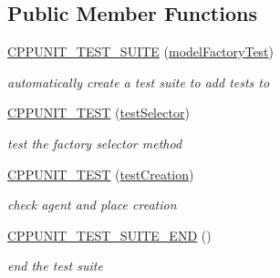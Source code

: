 \subsection*{Public Member Functions}
\begin{DoxyCompactItemize}
\item 
\mbox{\label{classmodelFactoryTest_a20b209282561b641257928824314a49c}} 
\mbox{\hyperlink{classmodelFactoryTest_a20b209282561b641257928824314a49c}{C\+P\+P\+U\+N\+I\+T\+\_\+\+T\+E\+S\+T\+\_\+\+S\+U\+I\+TE}} (\mbox{\hyperlink{classmodelFactoryTest}{model\+Factory\+Test}})
\begin{DoxyCompactList}\small\item\em automatically create a test suite to add tests to \end{DoxyCompactList}\item 
\mbox{\label{classmodelFactoryTest_a52899c75fe7f21fd6a1c96151302bb5a}} 
\mbox{\hyperlink{classmodelFactoryTest_a52899c75fe7f21fd6a1c96151302bb5a}{C\+P\+P\+U\+N\+I\+T\+\_\+\+T\+E\+ST}} (\mbox{\hyperlink{classmodelFactoryTest_ae0327f9c7d653c9a4864122a3f088118}{test\+Selector}})
\begin{DoxyCompactList}\small\item\em test the factory selector method \end{DoxyCompactList}\item 
\mbox{\label{classmodelFactoryTest_a46a5eadbc8f9d03e0c6d5334ee687d49}} 
\mbox{\hyperlink{classmodelFactoryTest_a46a5eadbc8f9d03e0c6d5334ee687d49}{C\+P\+P\+U\+N\+I\+T\+\_\+\+T\+E\+ST}} (\mbox{\hyperlink{classmodelFactoryTest_a1bea8789a99ca88af5942eaf6c3fa687}{test\+Creation}})
\begin{DoxyCompactList}\small\item\em check agent and place creation \end{DoxyCompactList}\item 
\mbox{\label{classmodelFactoryTest_a8f11a0a4ce2d23277167233305b1040e}} 
\mbox{\hyperlink{classmodelFactoryTest_a8f11a0a4ce2d23277167233305b1040e}{C\+P\+P\+U\+N\+I\+T\+\_\+\+T\+E\+S\+T\+\_\+\+S\+U\+I\+T\+E\+\_\+\+E\+ND}} ()
\begin{DoxyCompactList}\small\item\em end the test suite \end{DoxyCompactList}\item 

\end{DoxyCompactItemize}
